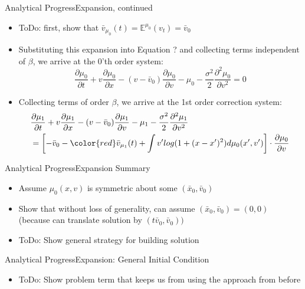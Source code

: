 \documentclass{beamer}
\begin{document}
\begin{frame}{Analytical Progress}{Expansion, continued}
	\begin{itemize}
		\item {
			ToDo: first, show that $\bar{v}_{\mu_0}(t)=\mathbb{E}^{\mu_0}(v_t)=\bar{v}_0$
		}
		\item {
			Substituting this expansion into Equation ? and collecting terms independent of $\beta$, we arrive at the 0'th order system:
			\begin{equation}
			\frac{\partial \mu_0}{\partial t}+v\frac{\partial \mu_0}{\partial x}-(v-\bar{v}_0)\frac{\partial \mu_0}{\partial v}-\mu_0-\frac{\sigma^2}{2}\frac{\partial^2 \mu_0}{\partial v^2}=0
			\label{0th}
			\end{equation}
		}
		\item {
			Collecting terms of order $\beta$, we arrive at the 1st order correction system:
			\begin{equation}
			\begin{split}
			&\frac{\partial \mu_1}{\partial t}+v\frac{\partial \mu_1}{\partial x}-(v-\bar{v}_0)\frac{\partial \mu_1}{\partial v}-\mu_1-\frac{\sigma^2}{2}\frac{\partial^2 \mu_1}{\partial v^2} \\
			&=\left[-\bar{v}_0-{\color{red}\bar{v}_{\mu_1}(t)}+ \int v' log(1+(x-x')^2) d \mu_0(x',v') \right] \cdot \frac{\partial \mu_0}{\partial v}
			\end{split}
			\label{1st}
			\end{equation}
		}
	\end{itemize}
\end{frame}

\begin{frame}{Analytical Progress}{Expansion Summary}
	\begin{itemize}
		\item {
			Assume $\mu_0(x,v)$ is symmetric about some $(\bar x_0,\bar v_0)$
		}
		\item {
			Show that without loss of generality, can assume $(\bar x_0,\bar v_0)=(0,0)$ (because can translate solution by $(t\bar v_0,\bar v_0))$
		}
		\item {
			ToDo: Show general strategy for building solution
		}
	\end{itemize}
\end{frame}

\begin{frame}{Analytical Progress}{Expansion: General Initial Condition}
	\begin{itemize}
		\item {
			ToDo: Show problem term that keeps us from using the approach from before
		}
	\end{itemize}
\end{frame}
\end{document}
